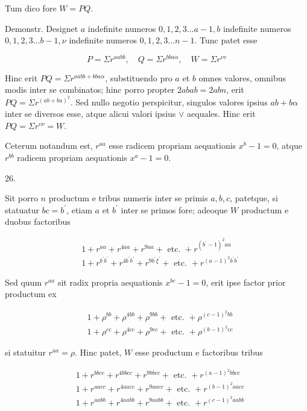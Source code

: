\documentclass[10pt]{article}
\begin{document}
Tum dico fore \(W=P Q\).

Demonstr. Designet \(a\) indefinite numeros \(0,1,2,3 \ldots a-1, b\) indefinite numeros \(0,1,2,3 \ldots b-1, \nu\) indefinite numeros \(0,1,2,3 \ldots n-1\). Tunc patet esse

\[
P=\Sigma r^{a a b b}, \quad Q=\Sigma r^{b b a \alpha}, \quad W=\Sigma r^{\nu v}
\]

Hinc erit \(P Q=\Sigma r^{a a b b+b b a \alpha}\), substituendo pro \(a\) et \(b\) omnes valores, omnibus modis inter se combinatos; hinc porro propter \(2 a b a b=2 a b n\), erit \(P Q=\Sigma r^{(a b+b a)^{2}}\). Sed nullo negotio perspicitur, singulos valores ipsius \(a b+b \alpha\) inter se diversos esse, atque alicui valori ipsius \(\vee\) aequales. Hinc erit \(P Q=\Sigma r^{v \nu}=W\).

Ceterum notandum est, \(r^{a a}\) esse radicem propriam aequationis \(x^{b}-1=0\), atque \(r^{b b}\) radicem propriam aequationis \(x^{a}-1=0\).

26.

Sit porro \(n\) productum e tribus numeris inter se primis \(a, b, c\), patetque, si statuatur \(b c=b^{\prime}\), etiam \(a\) et \(b^{\prime}\) inter se primos fore; adeoque \(W\) productum e duobus factoribus

\[
\begin{aligned}
& 1+r^{a a}+r^{4 a a}+r^{9 a a}+\text { etc. }+r^{\left(b^{\prime}-1\right)^{2} a a} \\
& 1+r^{b^{\prime} b^{\prime}}+r^{4 b^{\prime} b^{\prime}}+r^{9 b^{\prime} \xi^{\prime}}+\text { etc. }+r^{(a-1)^{2} b^{\prime} b^{\prime}}
\end{aligned}
\]

Sed quum \(r^{a a}\) sit radix propria aequationis \(x^{b c}-1=0\), erit ipse factor prior productum ex

\[
\begin{aligned}
& 1+\rho^{b b}+\rho^{4 b b}+\rho^{9 b b}+\text { etc. }+\rho^{(c-1)^{2} b b} \\
& 1+\rho^{c c}+\rho^{4 c c}+\rho^{9 c c}+\text { etc. }+\rho^{(b-1)^{2} c c}
\end{aligned}
\]

si statuitur \(r^{a a}=\rho\). Hinc patet, \(W\) esse productum e factoribus tribus

\[
\begin{aligned}
& 1+r^{b b c c}+r^{4 b b c c}+r^{9 b b c c}+\text { etc. }+r^{(a-1)^{2} b b c c} \\
& 1+r^{a a c c}+r^{4 a a c c}+r^{9 a a c c}+\text { etc. }+r^{(b-1)^{2} a a c c} \\
& 1+r^{a a b b}+r^{4 a a b b}+r^{9 a a b b}+\text { etc. }+r^{(c-1)^{2} a a b b}
\end{aligned}
\]
\end{document}
